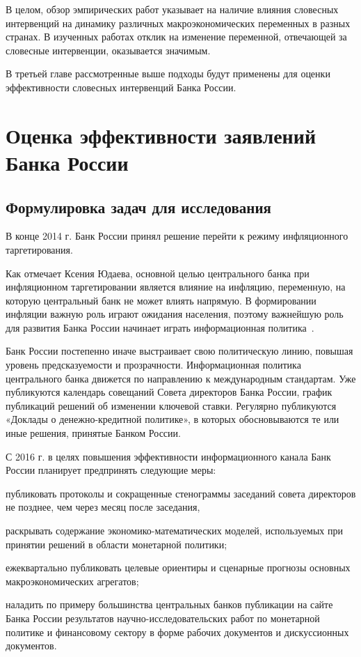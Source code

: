 \documentclass[14pt,a4paper, oneside]{extreport}
\renewenvironment{itemize}%
{\begin{list}{--} {%
\setlength{\parsep}{0em}%
\setlength{\itemsep}{0em}%
\setlength{\topsep}{0em}%
\setlength{\parskip}{0em}
}}%
{\end{list}}
\theoremstyle{plain}              %
\theoremstyle{definition}         %
\begin{document}
В целом, обзор эмпирических работ указывает на наличие влияния словесных интервенций на динамику различных макроэкономических переменных в разных  странах. В изученных работах отклик на изменение переменной, отвечающей за словесные интервенции, оказывается значимым. 

В третьей главе рассмотренные выше подходы будут применены для оценки эффективности словесных интервенций Банка России.


\chapter{Оценка эффективности заявлений Банка России}

\section{Формулировка задач для исследования}

В конце 2014 г. Банк России принял решение перейти к режиму инфляционного таргетирования. 

Как отмечает Ксения Юдаева, основной целью центрального банка при инфляционном таргетировании является влияние на инфляцию, переменную, на которую центральный банк не может влиять напрямую. В формировании инфляции важную роль играют ожидания населения, поэтому важнейшую роль для развития Банка России начинает играть информационная политика~\cite{UDAEVA}. 

Банк России постепенно иначе выстраивает свою политическую линию, повышая уровень предсказуемости и прозрачности. Информационная политика центрального банка движется по направлению к международным стандартам. Уже публикуются календарь совещаний Совета директоров Банка России, график публикаций решений об изменении ключевой ставки. Регулярно публикуются «Доклады о денежно-кредитной политике», в которых обосновываются те или иные решения, принятые Банком России. 

С 2016 г. в целях повышения эффективности информационного канала Банк России планирует предпринять следующие меры:

\begin{itemize}
\item публиковать протоколы и сокращенные стенограммы заседаний совета директоров не позднее, чем через месяц после заседания,

\item раскрывать содержание экономико-математических моделей, используемых при принятии решений в области монетарной политики;

\item ежеквартально публиковать целевые ориентиры и сценарные прогнозы основных макроэкономических агрегатов;

\item наладить по примеру большинства центральных банков публикации на сайте Банка России результатов научно-исследовательских работ по монетарной политике и финансовому сектору в форме рабочих документов и дискуссионных документов.
\end{itemize}
\end{document}

